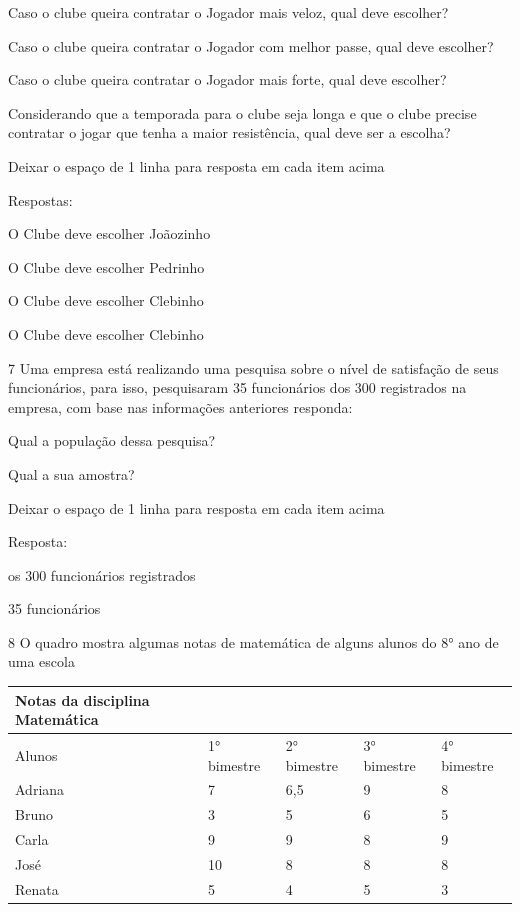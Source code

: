\item Caso o clube queira contratar o Jogador mais veloz, qual deve
escolher?

\item Caso o clube queira contratar o Jogador com melhor passe, qual deve
escolher?

\item Caso o clube queira contratar o Jogador mais forte, qual deve
escolher?

\item Considerando que a temporada para o clube seja longa e que o clube
precise contratar o jogar que tenha a maior resistência, qual deve ser a
escolha?

Deixar o espaço de 1 linha para resposta em cada item acima

Respostas:

\item O Clube deve escolher Joãozinho
\item O Clube deve escolher Pedrinho
\item O Clube deve escolher Clebinho
\item O Clube deve escolher Clebinho

\num{7} Uma empresa está realizando uma pesquisa sobre o nível de satisfação
de seus funcionários, para isso, pesquisaram 35 funcionários dos 300
registrados na empresa, com base nas informações anteriores responda:

\item Qual a população dessa pesquisa?
\item Qual a sua amostra?

Deixar o espaço de 1 linha para resposta em cada item acima

Resposta:

\item os 300 funcionários registrados
\item 35 funcionários

\num{8} O quadro mostra algumas notas de matemática de alguns alunos do 8°
ano de uma escola

\begin{longtable}[]{@{}lllll@{}}
\toprule
Notas da disciplina Matemática & & & &\tabularnewline
\midrule
\endhead
Alunos & 1° bimestre & 2° bimestre & 3° bimestre & 4°
bimestre\tabularnewline
Adriana & 7 & 6,5 & 9 & 8\tabularnewline
Bruno & 3 & 5 & 6 & 5\tabularnewline
Carla & 9 & 9 & 8 & 9\tabularnewline
José & 10 & 8 & 8 & 8\tabularnewline
Renata & 5 & 4 & 5 & 3\tabularnewline
\bottomrule
\end{longtable}

